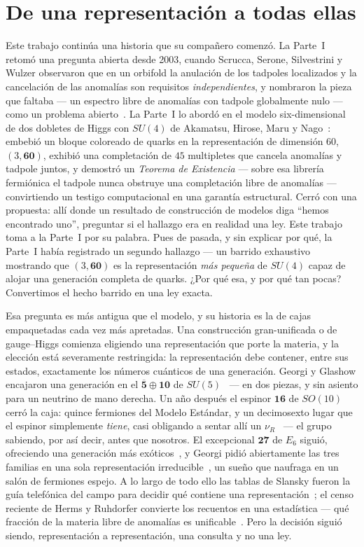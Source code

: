 \documentclass[11pt,a4paper]{article}
\begin{document}
\section{De una representación a todas ellas}\label{sec:intro}
Este trabajo continúa una historia que su compañero comenzó. La Parte~I~\cite{PartI} retomó
una pregunta abierta desde 2003, cuando Scrucca, Serone, Silvestrini y Wulzer observaron que
en un orbifold la anulación de los tadpoles localizados y la cancelación de las anomalías son
requisitos \emph{independientes}, y nombraron la pieza que faltaba --- un espectro libre de
anomalías con tadpole globalmente nulo --- como un problema abierto~\cite{SSSW}. La Parte~I lo
abordó en el modelo six-dimensional de dos dobletes de Higgs con $SU(4)$ de Akamatsu, Hirose,
Maru y Nago~\cite{AHMN}: embebió un bloque coloreado de quarks en la representación de
dimensión $60$, $(3,\mathbf{60})$, exhibió una completación de $45$ multipletes que cancela
anomalías y tadpole juntos, y demostró un \emph{Teorema de Existencia} --- sobre esa librería
fermiónica el tadpole nunca obstruye una completación libre de anomalías --- convirtiendo un
testigo computacional en una garantía estructural. Cerró con una propuesta: allí donde un
resultado de construcción de modelos diga ``hemos encontrado uno'', preguntar si el hallazgo
era en realidad una ley. Este trabajo toma a la Parte~I por su palabra. Pues de pasada, y sin
explicar por qué, la Parte~I había registrado un segundo hallazgo --- un barrido exhaustivo
mostrando que $(3,\mathbf{60})$ es la representación \emph{más pequeña} de $SU(4)$ capaz de
alojar una generación completa de quarks. ¿Por qué esa, y por qué tan pocas? Convertimos el
hecho barrido en una ley exacta.

Esa pregunta es más antigua que el modelo, y su historia es la de cajas empaquetadas cada vez
más apretadas. Una construcción gran-unificada o de gauge--Higgs comienza eligiendo una
representación que porte la materia, y la elección está severamente restringida: la
representación debe contener, entre sus estados, exactamente los números cuánticos de una
generación. Georgi y Glashow encajaron una generación en el
$\overline{\mathbf 5}\oplus\mathbf{10}$ de $SU(5)$~\cite{GeorgiGlashow} --- en dos piezas, y
sin asiento para un neutrino de mano derecha. Un año después el espinor $\mathbf{16}$ de
$SO(10)$ cerró la caja: quince fermiones del Modelo Estándar, y un decimosexto lugar que el
espinor simplemente \emph{tiene}, casi obligando a sentar allí un $\nu_R$~\cite{SO10FM,SO10G}
--- el grupo sabiendo, por así decir, antes que nosotros. El excepcional $\mathbf{27}$ de
$E_6$ siguió, ofreciendo una generación más exóticos~\cite{E6}, y Georgi pidió abiertamente
las tres familias en una sola representación irreducible~\cite{GeorgiFlavor,Yamatsu}, un sueño
que naufraga en un salón de fermiones espejo. A lo largo de todo ello las tablas de Slansky
fueron la guía telefónica del campo para decidir qué contiene una
representación~\cite{Slansky}; el censo reciente de Herms y Ruhdorfer convierte los recuentos
en una estadística --- qué fracción de la materia libre de anomalías es
unificable~\cite{HermsRuhdorfer}. Pero la decisión siguió siendo, representación a
representación, una consulta y no una ley.
\end{document}
